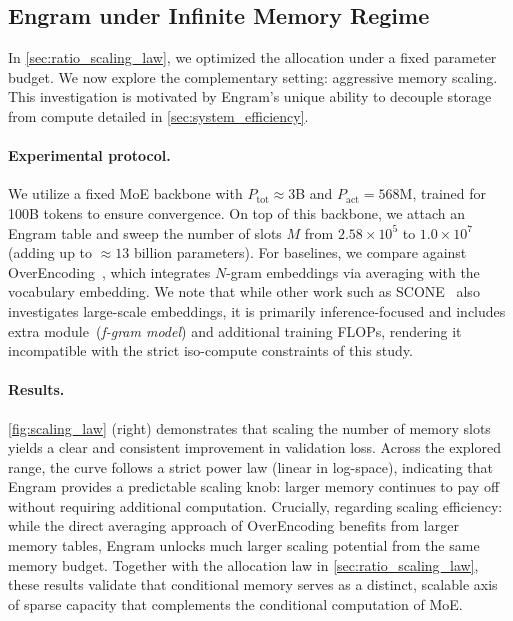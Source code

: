 \subsection{Engram under Infinite Memory Regime}
\label{sec:infinite_memory}

In \autoref{sec:ratio_scaling_law}, we optimized the allocation under a fixed parameter budget. We now explore the complementary setting: aggressive memory scaling.
This investigation is motivated by Engram's unique ability to decouple storage from compute detailed in \autoref{sec:system_efficiency}.

\paragraph{Experimental protocol.}
We utilize a fixed MoE backbone with $P_{\mathrm{tot}}\approx 3$B and $P_{\mathrm{act}}=568$M, trained for 100B tokens to ensure convergence.
On top of this backbone, we attach an Engram table and sweep the number of slots $M$ from $2.58\times 10^5$ to $1.0\times 10^7$ (adding up to $\approx 13$ billion parameters).
For baselines, we compare against OverEncoding~\citep{huang2025over}, which integrates $N$-gram embeddings via averaging with the vocabulary embedding.
We note that while other work such as SCONE~\citep{yu2025scaling} also investigates large-scale embeddings, it is primarily inference-focused and includes extra module~(\textit{f-gram model}) and additional training FLOPs, rendering it incompatible with the strict iso-compute constraints of this study.

\paragraph{Results.}
\autoref{fig:scaling_law} (right) demonstrates that scaling the number of memory slots yields a clear and consistent improvement in validation loss.
Across the explored range, the curve follows a strict power law (linear in log-space), indicating that Engram provides a predictable scaling knob: larger memory continues to pay off without requiring additional computation.
Crucially, regarding scaling efficiency: while the direct averaging approach of OverEncoding benefits from larger memory tables, Engram unlocks much larger scaling potential from the same memory budget. Together with the allocation law in \autoref{sec:ratio_scaling_law}, these results validate that conditional memory serves as a distinct, scalable axis of sparse capacity that complements the conditional computation of MoE.